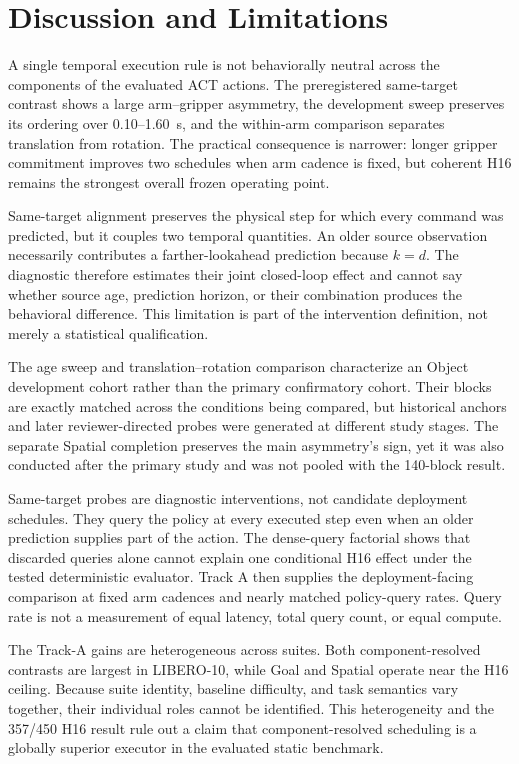\section{Discussion and Limitations}
\label{sec:limitations}

A single temporal execution rule is not behaviorally neutral across the
components of the evaluated ACT actions. The preregistered same-target contrast
shows a large arm--gripper asymmetry, the development sweep preserves its
ordering over 0.10--1.60~s, and the within-arm comparison separates translation
from rotation. The practical consequence is narrower: longer gripper
commitment improves two schedules when arm cadence is fixed, but coherent H16
remains the strongest overall frozen operating point.

Same-target alignment preserves the physical step for which every command was
predicted, but it couples two temporal quantities. An older source observation
necessarily contributes a farther-lookahead prediction because $k=d$. The
diagnostic therefore estimates their joint closed-loop effect and cannot say
whether source age, prediction horizon, or their combination produces the
behavioral difference. This limitation is part of the intervention definition,
not merely a statistical qualification.

The age sweep and translation--rotation comparison characterize an Object
development cohort rather than the primary confirmatory cohort. Their blocks
are exactly matched across the conditions being compared, but historical
anchors and later reviewer-directed probes were generated at different study
stages. The separate Spatial completion preserves the main asymmetry's sign,
yet it was also conducted after the primary study and was not pooled with the
140-block result.

Same-target probes are diagnostic interventions, not candidate deployment
schedules. They query the policy at every executed step even when an older
prediction supplies part of the action. The dense-query factorial shows that
discarded queries alone cannot explain one conditional H16 effect under the
tested deterministic evaluator. Track A then supplies the deployment-facing
comparison at fixed arm cadences and nearly matched policy-query rates. Query
rate is not a measurement of equal latency, total query count, or equal
compute.

The Track-A gains are heterogeneous across suites. Both component-resolved
contrasts are largest in LIBERO-10, while Goal and Spatial operate near the H16
ceiling. Because suite identity, baseline difficulty, and task semantics vary
together, their individual roles cannot be identified. This heterogeneity and
the 357/450 H16 result rule out a claim that component-resolved scheduling is a
globally superior executor in the evaluated static benchmark.

